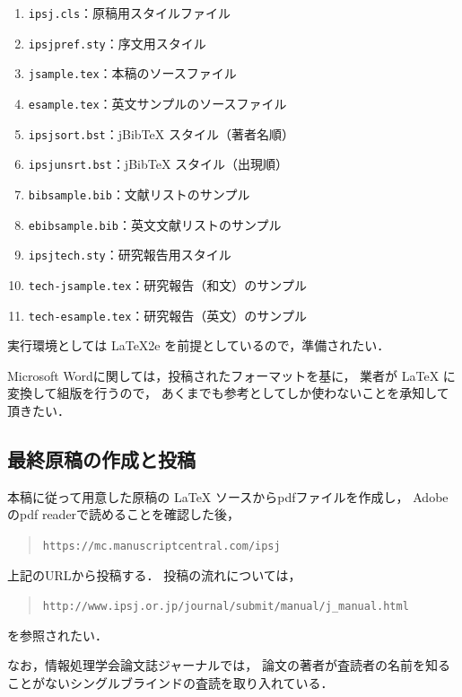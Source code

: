 \documentclass[submit]{ipsj}
\providecommand{\tightlist}{\setlength{\itemsep}{0pt}\setlength{\parskip}{0pt}}
\begin{document}
\begin{enumerate}
\def\labelenumi{\arabic{enumi}.}
\tightlist
\item
  \texttt{ipsj.cls}：原稿用スタイルファイル
\item
  \texttt{ipsjpref.sty}：序文用スタイル
\item
  \texttt{jsample.tex}：本稿のソースファイル
\item
  \texttt{esample.tex}：英文サンプルのソースファイル
\item
  \texttt{ipsjsort.bst}：jBibTeX スタイル（著者名順）
\item
  \texttt{ipsjunsrt.bst}：jBibTeX スタイル（出現順）
\item
  \texttt{bibsample.bib}：文献リストのサンプル
\item
  \texttt{ebibsample.bib}：英文文献リストのサンプル
\item
  \texttt{ipsjtech.sty}：研究報告用スタイル
\item
  \texttt{tech-jsample.tex}：研究報告（和文）のサンプル
\item
  \texttt{tech-esample.tex}：研究報告（英文）のサンプル
\end{enumerate}

実行環境としては LaTeX2e を前提としているので，準備されたい．

Microsoft Wordに関しては，投稿されたフォーマットを基に， 業者が LaTeX に変換して組版を行うので， あくまでも参考としてしか使わないことを承知して頂きたい．

\subsection{最終原稿の作成と投稿}\label{ux6700ux7d42ux539fux7a3fux306eux4f5cux6210ux3068ux6295ux7a3f}

本稿に従って用意した原稿の LaTeX ソースからpdfファイルを作成し， Adobeのpdf readerで読めることを確認した後，

\begin{quote}
\texttt{https://mc.manuscriptcentral.com/ipsj}
\end{quote}

上記のURLから投稿する． 投稿の流れについては，

\begin{quote}
\texttt{http://www.ipsj.or.jp/journal/submit/manual/j\_manual.html}
\end{quote}

を参照されたい．

なお，情報処理学会論文誌ジャーナルでは， 論文の著者が査読者の名前を知ることがないシングルブラインドの査読を取り入れている．
\end{document}
